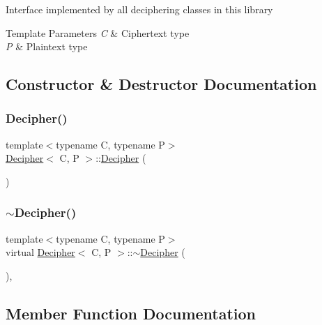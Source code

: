 Interface implemented by all deciphering classes in this library 
\begin{DoxyTemplParams}{Template Parameters}
{\em C} & Ciphertext type \\
\hline
{\em P} & Plaintext type \\
\hline
\end{DoxyTemplParams}


\subsection{Constructor \& Destructor Documentation}
\mbox{\label{classDecipher_a08c3ce832e3884da97f36fcfac6f70db}} 
\subsubsection{\texorpdfstring{Decipher()}{Decipher()}}
{\footnotesize\ttfamily template$<$typename C, typename P$>$ \\
\hyperlink{classDecipher}{Decipher}$<$ C, P $>$\+::\hyperlink{classDecipher}{Decipher} (\begin{DoxyParamCaption}{ }\end{DoxyParamCaption})\hspace{0.3cm}{\ttfamily [inline]}}

\mbox{\label{classDecipher_af1489f4e86a28217bdee9cf16d983faf}} 
\subsubsection{\texorpdfstring{$\sim$\+Decipher()}{~Decipher()}}
{\footnotesize\ttfamily template$<$typename C, typename P$>$ \\
virtual \hyperlink{classDecipher}{Decipher}$<$ C, P $>$\+::$\sim$\hyperlink{classDecipher}{Decipher} (\begin{DoxyParamCaption}{ }\end{DoxyParamCaption})\hspace{0.3cm}{\ttfamily [inline]}, {\ttfamily [virtual]}}



\subsection{Member Function Documentation}
\mbox{\label{classDecipher_ac6b8c369eda2d7e17fa90cb594cf41b6}} 
